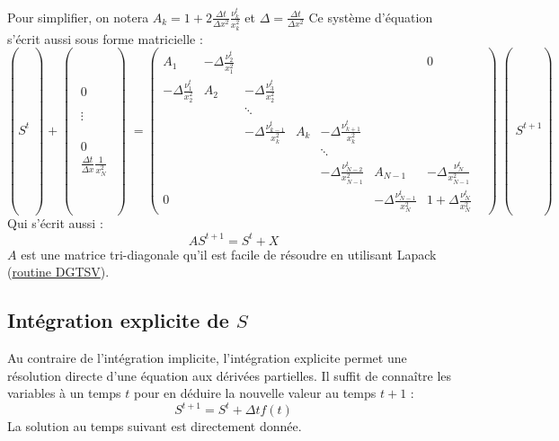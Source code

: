 Pour simplifier, on notera $A_k = 1 + 2 \frac{\Delta t}{\Delta x^2}\frac{\nu_k^t}{x_k^2}$ et $\Delta = \frac{\Delta t}{\Delta x^2}$
Ce système d'équation s'écrit aussi sous forme matricielle :
\begin{equation}
  \left(S^t\middle) + 
  \middle(\begin{matrix}
    0 \\
    \\
    \\
    \vdots \\
    \\
    \\
    \\
    0 \\
    \frac{\Delta t}{\Delta x}\frac{1}{x_N^2}
  \end{matrix}\middle)
  =
  \begin{pmatrix}
A_1                            & -\Delta\frac{\nu_{2}^t}{x_1^2} &  & & & & 0\\
-\Delta \frac{\nu_{1}^t}{x_2^2} & A_2                           & -\Delta\frac{\nu_{3}^t}{x_2^2} & & & &\\
    &        & \ddots                          &  & & & &\\
    &        & -\Delta \frac{\nu_{k-1}^t}{x_k^2} & A_k    & -\Delta \frac{\nu_{k+1}^t}{x_k^2} & &\\
    &        &                                 & & \ddots                          & & \\
    & & & & -\Delta \frac{\nu_{N-2}^t}{x_{N-1}^2} & A_{N-1} & -\Delta \frac{\nu_{N}^t}{x_{N-1}^2}\\
    0 & & & & & -\Delta \frac{\nu_{N-1}^t}{x_N^2} & 1 + \Delta \frac{\nu_N^t}{x_N^2}
  \end{pmatrix} \middle(S^{t+1}\right)
\end{equation}
Qui s'écrit aussi :
\begin{equation}
  AS^{t+1} = S^t + X 
\end{equation}
$A$ est une matrice tri-diagonale qu'il est facile de résoudre en utilisant Lapack (\href{http://www.netlib.org/lapack/explore-html/d4/d62/group__double_g_tsolve.html#ga2bf93f2ddefa5e671866eb2191dc19d4}{routine DGTSV}).

\subsection{Intégration explicite de $S$}

\label{ssec:integration_S_exp}
Au contraire de l'intégration implicite, l'intégration explicite permet une résolution directe d'une équation aux dérivées partielles. Il suffit de connaître les variables à un temps $t$ pour en déduire la nouvelle valeur au temps $t+1$ :
\begin{equation}
  S^{t+1} = S^t + \Delta t f(t)
\end{equation}
La solution au temps suivant est directement donnée.

